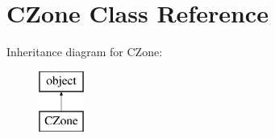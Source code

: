 \hypertarget{class_c_zone_1_1_c_zone}{}\section{C\+Zone Class Reference}
\label{class_c_zone_1_1_c_zone}
Inheritance diagram for C\+Zone\+:\begin{figure}[H]
\begin{center}
\leavevmode
\includegraphics[height=2.000000cm]{class_c_zone_1_1_c_zone}
\end{center}
\end{figure}
